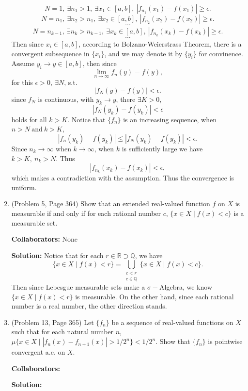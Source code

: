 \documentclass{article}%
\begin{document}
\begin{enumerate}
$$
N = 1, ~\exists n_1 > 1, ~\exists x_1\in[a, b], ~|f_{n_1}(x_1)-f(x_1)| \geqslant \epsilon.
$$
$$
N = n_1, ~\exists n_2 > n_1, ~\exists x_2\in[a, b], ~|f_{n_2}(x_2)-f(x_2)| \geqslant \epsilon.
$$
$$
\cdots
$$
$$
N = n_{k-1}, ~\exists n_k > n_{k-1}, ~\exists x_k\in[a, b], ~|f_{n_k}(x_k)-f(x_k)| \geqslant \epsilon.
$$
$$
\cdots
$$
Then since $x_i\in [a, b]$, according to Bolzano-Weierstrass Theorem, there is a convergent subsequence in $\{x_i\}$, and we may denote it by $\{y_i\}$ for convinence. Assume $y_i\to y\in [a, b]$, then since
$$
\lim_{n\to\infty}f_n(y) = f(y),
$$
for this $\epsilon > 0, ~\exists N$, s.t.
$$
|f_N(y)-f(y)|<\epsilon.
$$
since $f_N$ is continuous, with $y_k\to y$, there $\exists K > 0$, 
$$
|f_N(y_k)-f(y_k)| < \epsilon
$$
holds for all $k > K$. Notice that $\{f_n\}$ is an increasing sequence, when $n > N ~\text{and}~ k > K$, 
$$
|f_n(y_k)-f(y_k)| \leqslant |f_N(y_k)-f(y_k)|<\epsilon.
$$
Since $n_k\to\infty$ when $k\to\infty$, when $k$ is sufficiently large we have $k > K, ~n_k > N$. Thus 
$$
|f_{n_k}(x_k)-f(x_k)| < \epsilon,
$$ 
which makes a contradiction with the assumption. Thus the convergence is uniform.
\bigskip



\item  (Problem 5, Page 364) Show that an extended real-valued function $f$ on $X$ is measurable if and only if for each rational number $c$, $\{x\in X \mid f(x)< c\}$ is a  measurable set.


\bigskip
\textbf{Collaborators:} None
\smallskip
 
\textbf{Solution:}
Notice that for each $r\in \mathbb{R}\supset\mathbb{Q}$, we have
$$
\{x\in X\mid f(x) < r\} = \bigcup_{\substack{c < r \\ c \in \mathbb{Q}}}\{x\in X\mid f(x) < c\}.
$$
Then since Lebesgue measurable sets make a $\sigma-$Algebra, we know $\{x\in X\mid f(x) < r\}$ is measurable. On the other hand, since each rational number is a real number, the other direction stands.
\bigskip

\item (Problem 13, Page 365) Let $\{f_n\}$ be a sequence of real-valued functions on $X$ such that for each natural number $n$, $\mu \{x\in X \mid |f_n (x) - f_{n+1}(x)|> 1/2^n\}<1/2^n$. Show that $\{f_n\}$ is pointwise convergent a.e. on $X$.

\bigskip
\textbf{Collaborators:}\\
\smallskip
 
\textbf{Solution:}
\bigskip


\end{enumerate}
\end{document}
